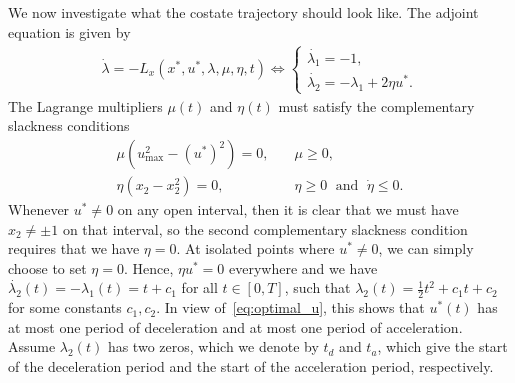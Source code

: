 \documentclass[a4paper]{article}
\theoremstyle{definition}
\theoremstyle{plain}
\begin{document}
We now investigate what the costate trajectory should look like.
The adjoint equation is given by
\begin{align*}
  \dot{\lambda} = - L_{x}(x^{*}, u^{*}, \lambda, \mu, \eta, t) \iff
  \begin{cases}
    \dot{\lambda_{1}} = -1 , \\
    \dot{\lambda_{2}} = - \lambda_{1} + 2 \eta u^{*} .
  \end{cases}
\end{align*}
%
The Lagrange multipliers $\mu(t)$ and $\eta(t)$ must satisfy the complementary slackness conditions
\begin{align*}
  \mu (u_{\max}^{2} - {(u^{*})}^{2}) = 0 ,& \quad \mu \geq 0 , \\
  \eta (x_{2} - x_{2}^{2}) = 0 ,& \quad \eta \geq 0 \; \text{ and } \; \dot{\eta} \leq 0 .
\end{align*}
%
Whenever $u^{*} \neq 0$ on any open interval, then it is clear that we must have
$x_{2} \neq \pm 1$ on that interval, so the second complementary slackness
condition requires that we have $\eta = 0$. At isolated points where
$u^{*} \neq 0$, we can simply choose to set $\eta = 0$. Hence, $\eta u^{*} = 0$
everywhere and we have $\dot{\lambda_{2}}(t) = -\lambda_{1}(t) = t + c_{1}$ for
all $t \in [0, T]$, such that
$\lambda_{2}(t) = \frac{1}{2}t^{2} + c_{1}t + c_{2}$ for some constants
$c_{1}, c_{2}$.
%
In view of~\eqref{eq:optimal_u}, this shows that $u^{*}(t)$ has at most one
period of deceleration and at most one period of acceleration.
%
Assume $\lambda_{2}(t)$ has two zeros, which we denote by $t_{d}$ and $t_{a}$,
which give the start of the deceleration period and the start of the
acceleration period, respectively.
\end{document}
